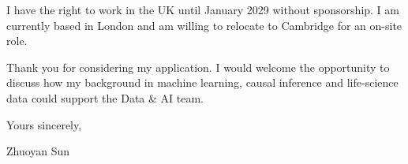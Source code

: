 \documentclass[letterpaper,11pt]{article}
\begin{document}
I have the right to work in the UK until January 2029 without sponsorship. I am currently based in London and am willing to relocate to Cambridge for an on-site role.

Thank you for considering my application. I would welcome the opportunity to discuss how my background in machine learning, causal inference and life-science data could support the Data \& AI team.

\vspace{2pt}
Yours sincerely,

\vspace{8pt}
Zhuoyan Sun
\end{document}
